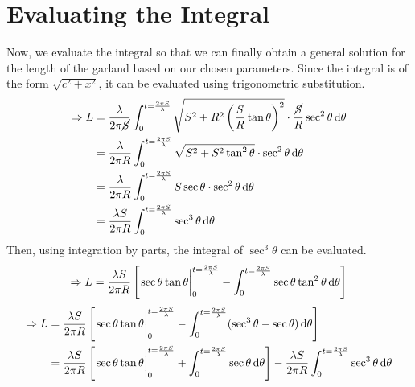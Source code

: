 \section{Evaluating the Integral}
Now, we evaluate the integral so that we can finally obtain a general solution for the length of the garland based on our chosen parameters. Since the integral is of the form $\sqrt{c^2+x^2}$, it can be evaluated using trigonometric substitution.
\newline{}
\begin{align}
    \Rightarrow L & = \frac{\lambda}{2\pi \cancel{S}}\int_0^{t =\frac{2\pi S}{\lambda}} \sqrt{S^2 + R^2\left(\frac{S}{R}\tan{\theta}\right)^2} \cdot \frac{\cancel{S}}{R}\sec^2{\theta} \dd{\theta} \notag \\
                  & = \frac{\lambda}{2\pi R}\int_0^{t =\frac{2\pi S}{\lambda}} \sqrt{S^2 + S^2\tan^2{\theta}} \cdot \sec^2{\theta} \dd{\theta} \notag                                                      \\
                  & = \frac{\lambda}{2\pi R}\int_0^{t =\frac{2\pi S}{\lambda}} S\sec{\theta} \cdot \sec^2{\theta} \dd{\theta} \notag                                                                       \\
                  & = \frac{\lambda S}{2\pi R}\int_0^{t =\frac{2\pi S}{\lambda}} \sec^3{\theta} \dd{\theta}    \label{eq:subbed}
\end{align}
Then, using integration by parts, the integral of $\sec^3{\theta}$ can be evaluated.
\newline{}
\begin{equation*}
    \Rightarrow L = \frac{\lambda S}{2\pi R}\left[\eval{\sec{\theta}\tan{\theta}}_0^{t =\frac{2\pi S}{\lambda}}-\int_0^{t =\frac{2\pi S}{\lambda}} \sec{\theta}\tan^2{\theta} \dd{\theta}
    \right]
\end{equation*}
\begin{align*}
    \Rightarrow L & = \frac{\lambda S}{2\pi R}\left[\eval{\sec{\theta}\tan{\theta}}_0^{t =\frac{2\pi S}{\lambda}}-\int_0^{t =\frac{2\pi S}{\lambda}} (\sec^3{\theta} - \sec{\theta}) \dd{\theta}\right]                                                                      \\
                  & = \frac{\lambda S}{2\pi R}\left[\eval{\sec{\theta}\tan{\theta}}_0^{t =\frac{2\pi S}{\lambda}}+\int_0^{t =\frac{2\pi S}{\lambda}}  \sec{\theta} \dd{\theta}\right] - \frac{\lambda S}{2\pi R}\int_0^{t =\frac{2\pi S}{\lambda}}\sec^3{\theta} \dd{\theta}
\end{align*}
